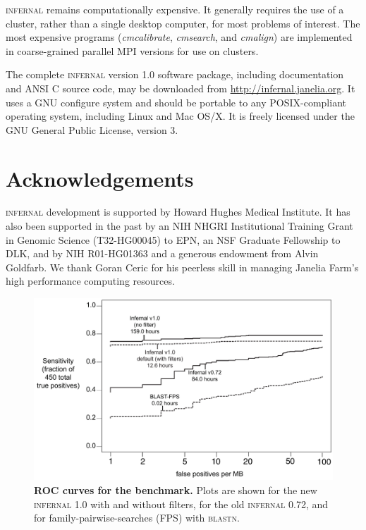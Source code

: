 \documentclass[11pt]{article}
\begin{document}
\textsc{infernal} remains computationally expensive. It generally
requires the use of a cluster, rather than a single desktop computer,
for most problems of interest. The most expensive programs
(\emph{cmcalibrate}, \emph{cmsearch}, and \emph{cmalign}) are
implemented in coarse-grained parallel MPI versions for use on
clusters. 

The complete \textsc{infernal} version 1.0 software package, including
documentation and ANSI C source code, may be downloaded from
\url{http://infernal.janelia.org}. It uses a GNU configure system and
should be portable to any POSIX-compliant operating system, including
Linux and Mac OS/X. It is freely licensed under the GNU General Public
License, version 3.

\section{Acknowledgements}

\textsc{infernal} development is supported by Howard Hughes Medical
Institute. It has also been supported in the past by an NIH NHGRI
Institutional Training Grant in Genomic Science (T32-HG00045) to EPN,
an NSF Graduate Fellowship to DLK, and by NIH R01-HG01363 and a
generous endowment from Alvin Goldfarb. We thank Goran Ceric for his
peerless skill in managing Janelia Farm's high performance computing
resources.



\newpage
\begin{figure}
\begin{center}
\includegraphics[width=6.4in]{figs/roc}
\caption{\textbf{ROC curves for the benchmark.}  Plots are shown for
the new \textsc{infernal} 1.0 with and without filters, for the old 
\textsc{infernal} 0.72, and for
family-pairwise-searches (FPS) with \textsc{blastn}.}
\label{fig:roc}
\end{center}
\end{figure}
\end{document}
